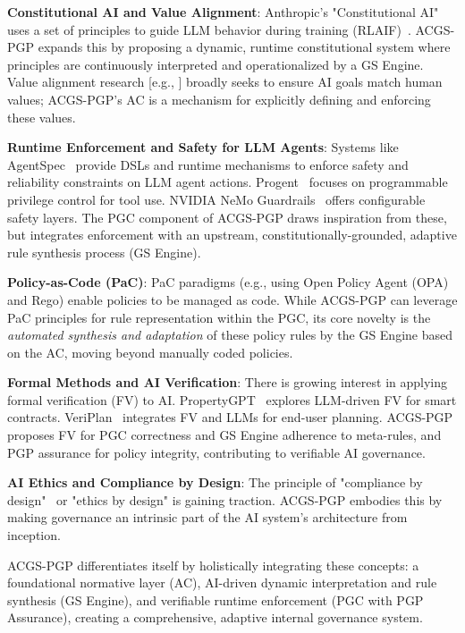 \documentclass[sigconf,review,anonymous=false]{acmart} %
\begin{document}
\textbf{Constitutional AI and Value Alignment}: Anthropic's "Constitutional AI" uses a set of principles to guide LLM behavior during training (RLAIF)~\cite{BaiConstitutionalAI22}. ACGS-PGP expands this by proposing a dynamic, runtime constitutional system where principles are continuously interpreted and operationalized by a GS Engine. Value alignment research [e.g., \cite{KrishnamurthyValueAlignment23}] broadly seeks to ensure AI goals match human values; ACGS-PGP's AC is a mechanism for explicitly defining and enforcing these values.

\textbf{Runtime Enforcement and Safety for LLM Agents}: Systems like AgentSpec~\cite{WangAgentSpec25} provide DSLs and runtime mechanisms to enforce safety and reliability constraints on LLM agent actions. Progent~\cite{LianProgent25} focuses on programmable privilege control for tool use. NVIDIA NeMo Guardrails~\cite{NVIDIANeMoGuardrails} offers configurable safety layers. The PGC component of ACGS-PGP draws inspiration from these, but integrates enforcement with an upstream, constitutionally-grounded, adaptive rule synthesis process (GS Engine).

\textbf{Policy-as-Code (PaC)}: PaC paradigms (e.g., using Open Policy Agent (OPA) and Rego) enable policies to be managed as code. While ACGS-PGP can leverage PaC principles for rule representation within the PGC, its core novelty is the \textit{automated synthesis and adaptation} of these policy rules by the GS Engine based on the AC, moving beyond manually coded policies.

\textbf{Formal Methods and AI Verification}: There is growing interest in applying formal verification (FV) to AI. PropertyGPT~\cite{LiuPropertyGPT25} explores LLM-driven FV for smart contracts. VeriPlan~\cite{ChakrabortiVeriPlan25} integrates FV and LLMs for end-user planning. ACGS-PGP proposes FV for PGC correctness and GS Engine adherence to meta-rules, and PGP assurance for policy integrity, contributing to verifiable AI governance.

\textbf{AI Ethics and Compliance by Design}: The principle of "compliance by design"~\cite{MartinezComplianceByDesign19} or "ethics by design" is gaining traction. ACGS-PGP embodies this by making governance an intrinsic part of the AI system's architecture from inception.

ACGS-PGP differentiates itself by holistically integrating these concepts: a foundational normative layer (AC), AI-driven dynamic interpretation and rule synthesis (GS Engine), and verifiable runtime enforcement (PGC with PGP Assurance), creating a comprehensive, adaptive internal governance system.
\end{document}
